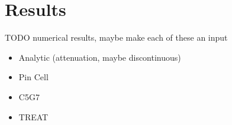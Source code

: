 \section{Results}
TODO numerical results, maybe make each of these an input
\begin{itemize}
  \item Analytic (attenuation, maybe discontinuous)
  \item Pin Cell
  \item C5G7
  \item TREAT
\end{itemize}
